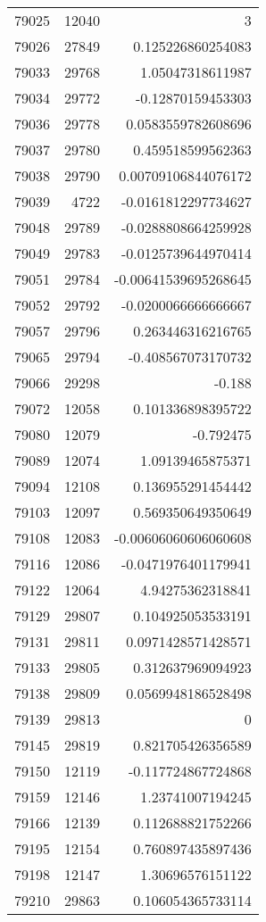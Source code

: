 \begin{tabular}{r | r | r}
79025 & 12040 & 3 \\
79026 & 27849 & 0.125226860254083 \\
79033 & 29768 & 1.05047318611987 \\
79034 & 29772 & -0.12870159453303 \\
79036 & 29778 & 0.0583559782608696 \\
79037 & 29780 & 0.459518599562363 \\
79038 & 29790 & 0.00709106844076172 \\
79039 & 4722 & -0.0161812297734627 \\
79048 & 29789 & -0.0288808664259928 \\
79049 & 29783 & -0.0125739644970414 \\
79051 & 29784 & -0.00641539695268645 \\
79052 & 29792 & -0.0200066666666667 \\
79057 & 29796 & 0.263446316216765 \\
79065 & 29794 & -0.408567073170732 \\
79066 & 29298 & -0.188 \\
79072 & 12058 & 0.101336898395722 \\
79080 & 12079 & -0.792475 \\
79089 & 12074 & 1.09139465875371 \\
79094 & 12108 & 0.136955291454442 \\
79103 & 12097 & 0.569350649350649 \\
79108 & 12083 & -0.00606060606060608 \\
79116 & 12086 & -0.0471976401179941 \\
79122 & 12064 & 4.94275362318841 \\
79129 & 29807 & 0.104925053533191 \\
79131 & 29811 & 0.0971428571428571 \\
79133 & 29805 & 0.312637969094923 \\
79138 & 29809 & 0.0569948186528498 \\
79139 & 29813 & 0 \\
79145 & 29819 & 0.821705426356589 \\
79150 & 12119 & -0.117724867724868 \\
79159 & 12146 & 1.23741007194245 \\
79166 & 12139 & 0.112688821752266 \\
79195 & 12154 & 0.760897435897436 \\
79198 & 12147 & 1.30696576151122 \\
79210 & 29863 & 0.106054365733114 \\

\end{tabular}
